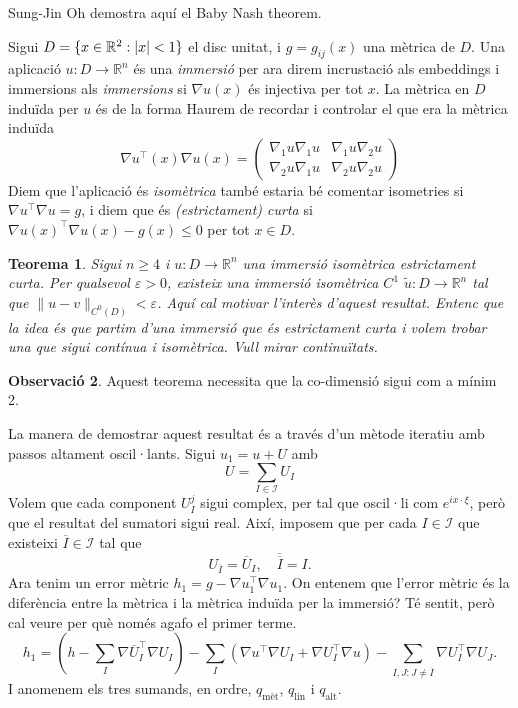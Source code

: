 \documentclass[11pt,a4paper,openright,oneside]{book}
\DeclarePairedDelimiter{\set}{\{}{\}}
\numberwithin{equation}{section}
\newtheorem{teo}{Teorema}[section]
\theoremstyle{definition}
\newtheorem{obs}[teo]{Observaci\'o}
\begin{document}
Sung-Jin Oh demostra aquí el Baby Nash theorem.


Sigui $D=\set{x\in\mathbb R^2 : |x|<1}$ el disc unitat, i $g = g_{ij}(x)$ una mètrica de $D$. Una aplicació $u:D\to\mathbb R^n$ és una \textit{immersió} {\color{blue} per ara direm incrustació als embeddings i immersions als \textit{immersions}} si $\nabla u(x)$ és injectiva per tot $x$. La mètrica en $D$ induïda per $u$ és de la forma {\color{blue} Haurem de recordar i controlar el que era la mètrica induïda}
\begin{equation*}
    \nabla u ^{\intercal}(x)\nabla u (x) = \begin{pmatrix}
    \nabla_1 u\nabla_1 u & \nabla_1 u\nabla_2 u\\
    \nabla_2 u\nabla_1 u & \nabla_2 u\nabla_2 u
    \end{pmatrix}
\end{equation*}
Diem que l'aplicació és \textit{isomètrica} {\color{blue} també estaria bé comentar isometries} si $\nabla u ^{\intercal}\nabla u = g$, i diem que és \textit{(estrictament) curta} si $\nabla u(x)^{\intercal} \nabla u(x) - g(x) \le 0$ per tot $x\in D$.
\begin{teo}\label{Baby Nash}
    Sigui $n\ge 4$ i $u:D\to\mathbb R^n$ una immersió isomètrica estrictament curta. Per qualsevol $\varepsilon > 0$, existeix una immersió isomètrica $C^1$ $\tilde u:D\to\mathbb R^n$ tal que $\|u-v\|_{C^0(D)} < \varepsilon$.{\color{blue} Aquí cal motivar l'interès d'aquest resultat. Entenc que la idea és que partim d'una immersió que és estrictament curta i volem trobar una que sigui contínua i isomètrica. Vull mirar continuïtats.}
\end{teo}
\begin{obs}
    Aquest teorema necessita que la co-dimensió sigui com a mínim 2.
\end{obs}
La manera de demostrar aquest resultat és a través d'un mètode iteratiu amb passos altament oscil·lants.
Sigui $u_1 = u + U$ amb 
\begin{equation*}
    U=\sum_{I\in\mathcal I} U_I
\end{equation*}
Volem que cada component $U_I^j$ sigui complex, per tal que oscil·li com $e^{ix \cdot \xi}$, però que el resultat del sumatori sigui real. Així, imposem que per cada $I\in\mathcal I$ que existeixi $\overline I\in\mathcal I$ tal que 
\begin{equation*}
    U_{\overline{I}} = \overline{U}_I, \quad \overline{\overline{I}} = I.
\end{equation*}
Ara tenim un error mètric $h_1 = g - \nabla u_1 ^{\intercal}\nabla u_1$. {\color{blue} On entenem que l'error mètric és la diferència entre la mètrica i la mètrica induïda per la immersió? Té sentit, però cal veure per què només agafo el primer terme.}
\begin{equation*}
    h_1 = 
        \left( h-\sum_{I} \nabla \overline{U}_I ^{\intercal}\nabla U_I \right) 
        - \sum_{I}\left( \nabla u ^{\intercal}\nabla U_I + \nabla U_I ^{\intercal}\nabla u \right)
        - \sum_{I,J: J\not = \overline I} \nabla U_I ^{\intercal}\nabla U_J.
\end{equation*}
I anomenem els tres sumands, en ordre, $q_{\text{mèt}}$, $q_{\text{lin}}$ i $q_{\text{alt}}$.
\end{document}
